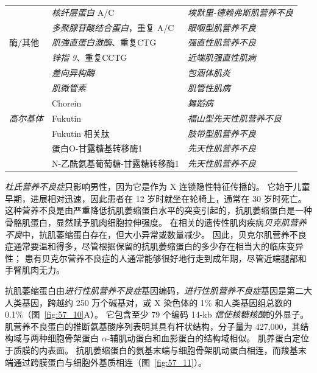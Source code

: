 \begin{table}[htbp]
\begin{tabular}{lll}
		 & \textit{核纤层蛋白} A/C & \textit{埃默里-德赖弗斯肌营养不良} \\
		 & \textit{多聚腺苷酸结合蛋白}，重复 A/C & \textit{眼咽型肌营养不良} \\
		酶/其他 & \textit{肌強直蛋白激酶}、重复CTG & \textit{强直性肌营养不良} \\
		 & \textit{锌指 9}、重复CCTG & \textit{近端肌强直性肌病} \\
		 & \textit{差向异构酶} & \textit{包涵体肌炎} \\
		 & \textit{肌微管素} & \textit{肌管性肌病} \\
		 & Chorein & \textit{舞蹈病} \\
		\textit{高尔基体} & Fukutin & \textit{福山型先天性肌营养不良} \\
		 & Fukutin 相关肽 & \textit{肢带型肌营养不良} \\
		 & 蛋白O-甘露糖基转移酶1 & \textit{先天性肌营养不良} \\
		 & N-乙酰氨基葡萄糖-甘露糖转移酶1 & \textit{先天性肌营养不良} \\
		\bottomrule
	\end{tabular}
\end{table}


\textit{杜氏营养不良症}只影响男性，因为它是作为 X 连锁隐性特征传播的。
它始于儿童早期，进展相对迅速，因此患者在 12 岁时就坐在轮椅上，通常在 30 岁时死亡。
这种营养不良是由严重降低抗肌萎缩蛋白水平的突变引起的，抗肌萎缩蛋白是一种骨骼肌蛋白，显然赋予肌肉细胞拉伸强度。
在相关的遗传性肌肉疾病\textit{贝克肌营养不良}中，抗肌萎缩蛋白存在，但大小异常或数量减少。
因此，贝克尔肌营养不良症通常要温和得多，尽管根据保留的抗肌萎缩蛋白的多少存在相当大的临床变异性；
患有贝克尔营养不良症的人通常能够很好地行走到成年期，尽管近端腿部和手臂肌肉无力。


抗肌萎缩蛋白由\textit{进行性肌营养不良症}基因编码，\textit{进行性肌营养不良症}基因是第二大人类基因，跨越约 250 万个碱基对，或 X 染色体的 1\% 和人类基因组总数的 0.1\%（图~\ref{fig:57_10}A）。
它包含至少 79 个编码 14-kb \textit{信使核糖核酸}的外显子。
肌营养不良蛋白的推断氨基酸序列表明其具有杆状结构，分子量为 427,000，其结构域与两种细胞骨架蛋白 $ \alpha $-辅肌动蛋白和血影蛋白的结构域相似。
肌养蛋白定位于质膜的内表面。
抗肌萎缩蛋白的氨基末端与细胞骨架肌动蛋白相连，而羧基末端通过跨膜蛋白与细胞外基质相连（图~\ref{fig:57_11}）。


